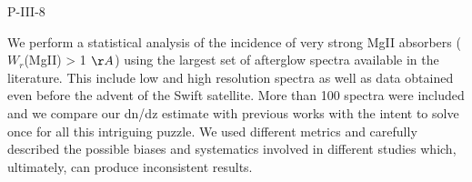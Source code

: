 P-III-8


\bigskip



\bigskip

\noindent We perform a statistical analysis of the incidence of very strong  MgII absorbers ($W_r$(MgII) > 1 $\AA$) using the largest set of afterglow spectra available in the literature. This include low and high resolution spectra as well as data obtained even before the advent of the Swift satellite. More than 100 spectra were included and we compare our dn/dz estimate with previous works with the intent to solve once for all this intriguing puzzle. We used different metrics and  carefully described the possible biases and systematics involved in different studies which, ultimately, can produce inconsistent results.

